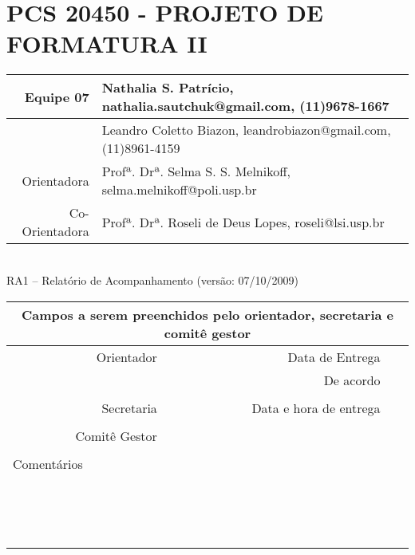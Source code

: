\documentclass[a4paper,12pt,font=plain,header=plain]{abnt}
\begin{document}
  \capa

	\renewenvironment{center}{}{}
	\section*{PCS 20450 - PROJETO DE FORMATURA II}
	
	\begin{tabular}[|l|]{ |r|l| }
	\hline
				Equipe 07 & Nathalia S. Patrício, nathalia.sautchuk@gmail.com, (11)9678-1667 \\
			\hline
				& Leandro Coletto Biazon, leandrobiazon@gmail.com, (11)8961-4159 \\
			\hline
					Orientadora & Profª. Drª. Selma S. S. Melnikoff, selma.melnikoff@poli.usp.br \\
			\hline
				Co-Orientadora & Profª. Drª. Roseli de Deus Lopes, roseli@lsi.usp.br \\
			\hline
			\end{tabular} \\
	
			RA1 – Relatório de Acompanhamento (versão: 07/10/2009) \\
	
			\begin{tabular}{ |r|r|r| }
	
			\hline
				\multicolumn{3}{|c|}{Campos a serem preenchidos pelo orientador, secretaria e comitê gestor} \\
			\hline
				Orientador & Data de Entrega &  \\
			\hline
				& De acordo &  \\
			\hline
				& &  \\
			\hline
				Secretaria & Data e hora de entrega &  \\
			\hline
				&  &  \\
			\hline
				Comitê Gestor &  &  \\
			\hline
			&  &  \\
			\hline
				\multicolumn{3}{|l|}{Comentários} \\
				\multicolumn{3}{|l|}{} \\
				\multicolumn{3}{|l|}{} \\
				\multicolumn{3}{|l|}{} \\
				\multicolumn{3}{|l|}{} \\
				\multicolumn{3}{|l|}{} \\
				\multicolumn{3}{|l|}{} \\
				\multicolumn{3}{|l|}{} \\
				\multicolumn{3}{|l|}{} \\
				\multicolumn{3}{|l|}{} \\
				\multicolumn{3}{|l|}{} \\
				\multicolumn{3}{|l|}{} \\
				\multicolumn{3}{|l|}{} \\
				\multicolumn{3}{|l|}{} \\
				\multicolumn{3}{|l|}{} \\
				\multicolumn{3}{|l|}{} \\
			\hline
			\end{tabular}
\end{document}
